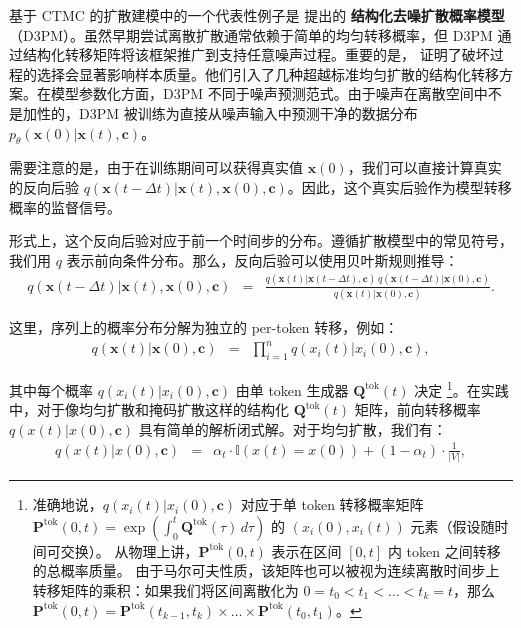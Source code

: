 基于 CTMC 的扩散建模中的一个代表性例子是 \citet{austin-etal:2021structured} 提出的 \textbf{结构化去噪扩散概率模型}（D3PM）。虽然早期尝试离散扩散通常依赖于简单的均匀转移概率，但 D3PM 通过结构化转移矩阵将该框架推广到支持任意噪声过程。重要的是，\citet{austin-etal:2021structured} 证明了破坏过程的选择会显著影响样本质量。他们引入了几种超越标准均匀扩散的结构化转移方案。在模型参数化方面，D3PM 不同于噪声预测范式。由于噪声在离散空间中不是加性的，D3PM 被训练为直接从噪声输入中预测干净的数据分布 $p_\theta(\mathbf{x}(0) | \mathbf{x}(t), \mathbf{c})$。

需要注意的是，由于在训练期间可以获得真实值 $\mathbf{x}(0)$，我们可以直接计算真实的反向后验 $q(\mathbf{x}(t - \Delta t) | \mathbf{x}(t), \mathbf{x}(0), \mathbf{c})$。因此，这个真实后验作为模型转移概率的监督信号。

形式上，这个反向后验对应于前一个时间步的分布。遵循扩散模型中的常见符号，我们用 $q$ 表示前向条件分布。那么，反向后验可以使用贝叶斯规则推导：
\begin{eqnarray}
q(\mathbf{x}(t - \Delta t) | \mathbf{x}(t), \mathbf{x}(0), \mathbf{c}) & = & \frac{q(\mathbf{x}(t) | \mathbf{x}(t - \Delta t), \mathbf{c}) \, q(\mathbf{x}(t - \Delta t) | \mathbf{x}(0), \mathbf{c})}{q(\mathbf{x}(t) | \mathbf{x}(0), \mathbf{c})}.
\end{eqnarray}

\noindent 这里，序列上的概率分布分解为独立的 per-token 转移，例如：
\begin{eqnarray}
q(\mathbf{x}(t)|\mathbf{x}(0), \mathbf{c}) & = & \prod_{i=1}^{n} q(x_i(t)|x_i(0), \mathbf{c}),
\end{eqnarray}

\noindent 其中每个概率 $q(x_i(t)|x_i(0), \mathbf{c})$ 由单 token 生成器 $\mathbf{Q}^{\mathrm{tok}}(t)$ 决定
\footnote{准确地说，$q(x_i(t)|x_i(0), \mathbf{c})$ 对应于单 token 转移概率矩阵
$\mathbf{P}^{\mathrm{tok}}(0,t) = \exp\!\left(\int_0^t \mathbf{Q}^{\mathrm{tok}}(\tau)\, d\tau\right)$ 的 $(x_i(0), x_i(t))$ 元素（假设随时间可交换）。
从物理上讲，$\mathbf{P}^{\mathrm{tok}}(0,t)$ 表示在区间 $[0, t]$ 内 token 之间转移的总概率质量。
由于马尔可夫性质，该矩阵也可以被视为连续离散时间步上转移矩阵的乘积：如果我们将区间离散化为 $0=t_0 < t_1 < \dots < t_k=t$，那么
$\mathbf{P}^{\mathrm{tok}}(0,t) = \mathbf{P}^{\mathrm{tok}}(t_{k-1},t_k)\times\dots\times \mathbf{P}^{\mathrm{tok}}(t_0,t_1)$。}。在实践中，对于像均匀扩散和掩码扩散这样的结构化 $\mathbf{Q}^{\mathrm{tok}}(t)$ 矩阵，前向转移概率 $q(x(t) | x(0), \mathbf{c})$ 具有简单的解析闭式解。对于均匀扩散，我们有：
\begin{eqnarray}
q(x(t) | x(0), \mathbf{c}) & = & \alpha_t \cdot \mathbb{I}(x(t) = x(0)) + (1 - \alpha_t) \cdot \frac{1}{|V|},
\end{eqnarray}


